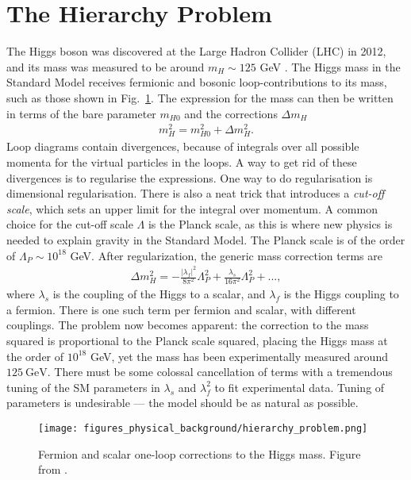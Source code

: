 \documentclass[twoside,english]{uiofysmaster}
\begin{document}
\section{The Hierarchy Problem}

The Higgs boson was discovered at the Large Hadron Collider (LHC) in 2012, and its mass was measured to be around $m_H \sim 125$ GeV \cite{20121}. The Higgs mass in the Standard Model receives fermionic and bosonic loop-contributions to its mass, such as those shown in Fig.~\ref{Fig:: Phys. bac.: Higgs mass contributions}. The expression for the mass can then be written in terms of the bare parameter $m_{H0}$ and the corrections $\Delta m_H$
\begin{align*}
m_H^2 = m_{H0}^2 + \Delta m_H^2.
\end{align*}
Loop diagrams contain divergences, because of integrals over all possible momenta for the virtual particles in the loops. A way to get rid of these divergences is to regularise the expressions. One way to do regularisation is dimensional regularisation. There is also a neat trick that introduces a \textit{cut-off scale}, which sets an upper limit for the integral over momentum. A common choice for the cut-off scale $\Lambda$ is the Planck scale, as this is where new physics is needed to explain gravity in the Standard Model. The Planck scale is of the order of $\Lambda_P \sim 10^{18}$ GeV. After regularization, the generic mass correction terms are
\begin{align}
\Delta m_H^2 = - \frac{|\lambda_f|^2}{8\pi^2} \Lambda_P^2 + \frac{\lambda_s}{16\pi^2} \Lambda_P^2 +...,
\end{align}
where $\lambda_s$ is the coupling of the Higgs to a scalar, and $\lambda_f$ is the Higgs coupling to a fermion. There is one such term per fermion and scalar, with different couplings. The problem now becomes apparent: the correction to the mass squared is proportional to the Planck scale squared, placing the Higgs mass at the order of $10^{18}$ GeV, yet the mass has been experimentally measured around $125~\mathrm{GeV}$. There must be some colossal cancellation of terms with a tremendous tuning of the SM parameters in $\lambda_s$ and $\lambda_f^2$ to fit experimental data. Tuning of parameters is undesirable --- the model should be as natural as possible. 

\begin{figure}[H]
\centering
\texttt{[image: figures\_physical\_background/hierarchy\_problem.png]}
\caption{Fermion and scalar one-loop corrections to the Higgs mass. Figure from \cite{batzing2017lecture}.}
\label{Fig:: Phys. bac.: Higgs mass contributions}
\end{figure}
\end{document}
